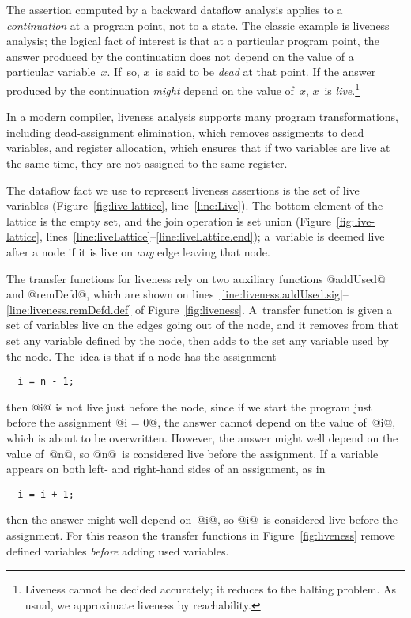 \documentclass[blockstyle,preprint,nocopyrightspace]{sigplanconf}
\newcommand\lineref[1]{line~\ref{line:#1}}
\newcommand\linerangeref[2]{\mbox{lines~\ref{line:#1}--\ref{line:#2}}}
\newcommand{\authornote}[1]{{\em #1}}
\def\authornote#1{\unskip\relax}
\newcommand{\norman}[1]{\authornote{NR: #1}}
\let\remark\norman
\newcommand\seclabel[1]{\label{sec:#1}}
\newcommand\figref[1]{Figure~\ref{fig:#1}}
\begin{document}
\seclabel{liveness}

The assertion computed by 
a backward dataflow analysis applies to a
\emph{continuation} at a program point, not to a state.
The classic example is liveness analysis;
the logical fact of interest is that at a particular program point,
the answer produced by the continuation does not depend on
the value of a particular variable~$x$.
If~so, $x$~is said to be \emph{dead} at that point.
If the answer produced by the continuation \emph{might} depend on the
value of~$x$, $x$~is \emph{live}.\footnote
{Liveness cannot be decided accurately; it reduces to the halting problem.
As usual, we approximate liveness by reachability.}

In a modern compiler, liveness analysis supports many program
transformations,
including
dead-assignment elimination,
which removes assigments to dead variables, 
and register allocation, which
ensures that if two variables are 
live at the same time, they are not assigned to the same register. 

The dataflow fact we use to represent liveness assertions is the set of
live variables (\figref{live-lattice}, \lineref{Live}).
The bottom element of the lattice is the empty set, and the join
operation is set union (\figref{live-lattice},
\linerangeref{liveLattice}{liveLattice.end}); 
a~variable is deemed live after a node if it is live on \emph{any} edge leaving that
node.

The transfer functions for liveness rely on two auxiliary functions
\remark{linenumbers}
@addUsed@ and @remDefd@, which are shown on
\linerangeref{liveness.addUsed.sig}{liveness.remDefd.def} of
\figref{liveness}. 
A~transfer function is given a set of variables live on the edges
going out of the node, and it removes from that set any variable
defined by the node, then adds to the set any variable used by the
node.
The~idea is that if a node has the assignment
\begin{verbatim}
  i = n - 1;
\end{verbatim}
then @i@ is not live just before the node, since if we start the
program just before the assignment @i = 0@, the answer cannot 
depend on the value of~@i@, which is about to be overwritten.
However, the answer might well depend on the value of~@n@, so
@n@~is considered live before the assignment.
If a variable appears on both left- and right-hand sides of an
assignment, as in
\begin{verbatim}
  i = i + 1;
\end{verbatim}
then the answer might well depend on~@i@, so @i@~is considered live
before the assignment.
For this reason the transfer functions in \figref{liveness} 
remove defined variables \emph{before} adding used variables.
\remark{line numbers}
\end{document}
